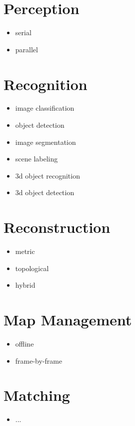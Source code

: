 \documentclass{article}
\begin{document}
	\section{Perception}
	
	\begin{itemize}
		\item serial
		\item parallel
	\end{itemize}
	
	\section{Recognition}
	
	\begin{itemize}
		\item image classification
		\item object detection
		\item image segmentation
		\item scene labeling
		\item 3d object recognition
		\item 3d object detection
	\end{itemize}
	
	\section{Reconstruction}
	
	\begin{itemize}
		\item metric
		\item topological
		\item hybrid
	\end{itemize}
	
	\section{Map Management}
	
	\begin{itemize}
		\item offline
		\item frame-by-frame
	\end{itemize}
	
	\section{Matching}
	
	\begin{itemize}
		\item ...
	\end{itemize}
\end{document}
